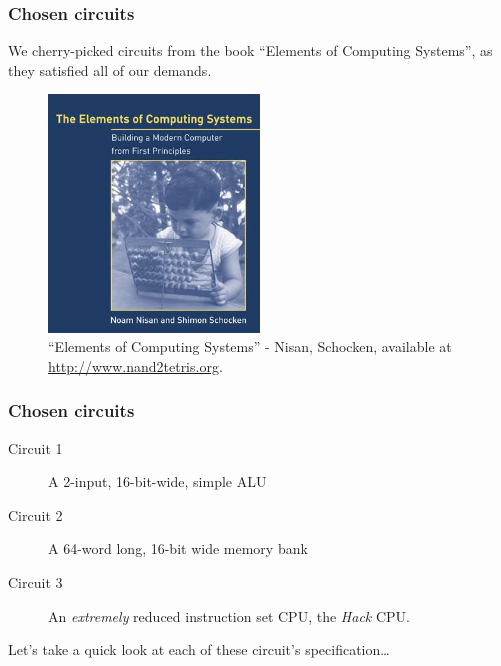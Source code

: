     \begin{frame}
        \frametitle{Chosen circuits}

        \par{We cherry-picked circuits from the book ``Elements of Computing Systems'',
            as they satisfied all of our demands.}

        \begin{figure}[h!]
            \includegraphics[width=0.5\textwidth]{imgs/book-cover-elements.jpg}
            \caption{``Elements of Computing Systems'' - Nisan, Schocken, \newline
                available at \url{http://www.nand2tetris.org}.
                \label{fig:book-cover-elements}
            }
        \end{figure}
    \end{frame}

    \begin{frame}
        \frametitle{Chosen circuits}

        \begin{description}
            \item[Circuit 1] A 2-input, 16-bit-wide, simple ALU
            \item[Circuit 2] A 64-word long, 16-bit wide memory bank
            \item[Circuit 3] An \emph{extremely} reduced instruction set CPU,
                the \emph{Hack} CPU.
        \end{description}
        \vspace{0.05\textwidth}

        \par{Let's take a quick look at each of these circuit's specification\ldots}
    \end{frame}


